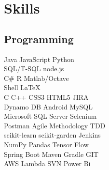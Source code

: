\documentclass[]{aj-resume-openfont}
\begin{document}
\begin{minipage}[t]{0.33\textwidth}

\section{Skills}
\subsection{Programming}
\textbullet{} Java \textbullet{} JavaScript \textbullet{} Python \\
\textbullet{} SQL/T-SQL \textbullet{} node.js \\ 
\textbullet{} C\# \textbullet{} R \textbullet{} Matlab/Octave \\
\textbullet{} Shell  \textbullet{} \LaTeX\ \\
\textbullet{} C \textbullet{} C++ \textbullet{} CSS3 \textbullet{} HTML5 \textbullet{} JIRA  \\
\textbullet{} Dynamo DB \textbullet{} Android \textbullet{} MySQL \\
\textbullet{} Microsoft SQL Server \textbullet{} Selenium \\
\textbullet{} Postman \textbullet{} Agile Methodology \textbullet{} TDD \\
\textbullet{} scikit-learn \textbullet{} scikit-garden \textbullet{} Jenkins\\ 
\textbullet{} NumPy \textbullet{} Pandas \textbullet{} Tensor Flow \\
\textbullet{} Spring Boot \textbullet{} Maven \textbullet{} Gradle \textbullet{} GIT \\
\textbullet{} AWS Lambda \textbullet{} SVN \textbullet{} Power Bi \\
\sectionsep

%
%

\end{minipage} 
\hfill
\end{document}
